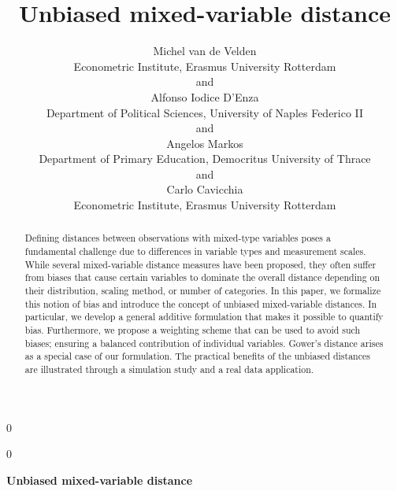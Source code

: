 \documentclass[12pt]{article}
\newcommand{\blind}{0}
\begin{document}
\def\spacingset#1{\renewcommand{\baselinestretch}%
{#1}\small\normalsize} \spacingset{1}

\date{ }

\blind
{
  \title{\bf Unbiased mixed-variable distance}
  \author{Michel van de Velden\\
    Econometric Institute, Erasmus University Rotterdam\\
    and \\
    Alfonso Iodice D'Enza \\
    Department of Political Sciences, University of Naples Federico II\\
    and \\
    Angelos Markos \\
    Department of Primary Education, Democritus University of Thrace\\
   and \\
    Carlo Cavicchia \\
   Econometric Institute, Erasmus University Rotterdam}
  \maketitle
} \fi

\blind
{
  \bigskip
  \bigskip
  \bigskip
  \begin{center}
    {\LARGE\bf Unbiased mixed-variable distance}
\end{center}
  \medskip
} \fi

\bigskip
\begin{abstract}
Defining distances between observations with mixed-type variables poses a fundamental challenge due to differences in variable types and measurement scales. While several mixed-variable distance measures have been proposed, they often suffer from biases that cause certain variables to dominate the overall distance depending on their distribution, scaling method, or number of categories. In this paper, we formalize this notion of bias and introduce the concept of unbiased mixed-variable distances. In particular, we develop a general additive formulation that makes it possible to quantify bias. Furthermore, we propose a weighting scheme that can be used to avoid such biases; ensuring a balanced contribution of individual variables. Gower’s distance arises as a special case of our formulation. The practical benefits of the unbiased distances are illustrated through a simulation study and a real data application.
\end{abstract}
\end{document}
